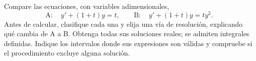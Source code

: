 Compare las ecuaciones, con variables adimensionales,
\[
\mathrm A:\quad y'+(1+t)y=t,
\qquad
\mathrm B:\quad y'+(1+t)y=t y^2.
\]
Antes de calcular, clasifique cada una y elija una vía de resolución, explicando qué cambia de A a B. Obtenga todas sus soluciones reales; se admiten integrales definidas. Indique los intervalos donde sus expresiones son válidas y compruebe si el procedimiento excluye alguna solución.
